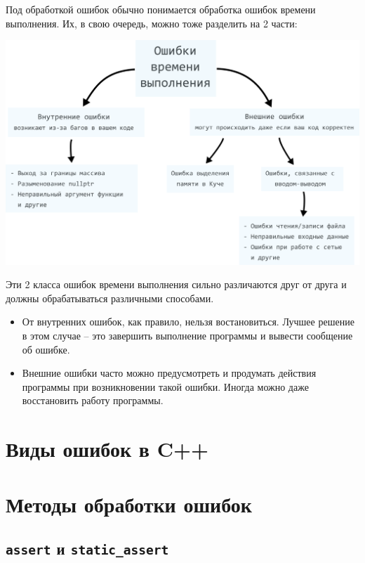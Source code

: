 \documentclass{article}
\begin{document}
Под обработкой ошибок обычно понимается обработка ошибок времени выполнения. Их, в свою очередь, можно тоже разделить на 2 части:
\begin{center}
\includegraphics[scale=0.9]{../images/error_types.png}
\end{center}

Эти 2 класса ошибок времени выполнения сильно различаются друг от друга и должны обрабатываться различными способами.

\begin{itemize}
\item От внутренних ошибок, как правило, нельзя востановиться. Лучшее решение в этом случае -- это завершить выполнение программы и вывести сообщение об ошибке.
\item Внешние ошибки часто можно предусмотреть и продумать действия программы при возникновении такой ошибки. Иногда можно даже восстановить работу программы.
\end{itemize}


\newpage

\section*{Виды ошибок в C++}


\section*{Методы обработки ошибок}

\subsection*{\texttt{assert} и \texttt{static\_assert}}
\end{document}

